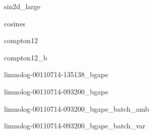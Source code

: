 \documentclass{article}
\newlength\figureheight
\newlength\figurewidth
\begin{document}
\setlength\figureheight{3.5in}
\setlength{}

\begin{figure}[h]
\centering

\caption{sin2d\_large}
\vspace{0.5in}

\caption{cosines}
\end{figure}

\begin{figure}[h]
\centering

\caption{compton12}
\vspace{0.5in}

\caption{compton12\_b}
\end{figure}

\begin{figure}[h]
\centering

\caption{limnolog-00110714-135138\_bgape}
\vspace{0.5in}

\caption{limnolog-00110714-093200\_bgape}
\end{figure}

\begin{figure}[h]
\centering

\caption{limnolog-00110714-093200\_bgape\_batch\_amb}
\vspace{0.5in}

\caption{limnolog-00110714-093200\_bgape\_batch\_var}
\end{figure}
\end{document}
